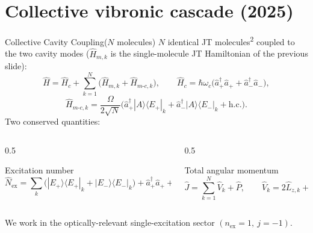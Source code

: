 \documentclass[aspectratio=169,11pt]{beamer}
\newcommand{\refmark}[1]{\textsuperscript{\color{srcgray}#1}}
\begin{document}
\section{Collective vibronic cascade (2025)}
\begin{frame}{Collective Cavity Coupling($N$ molecules)}
  \small
  $N$ identical JT molecules\refmark{2} coupled to the two cavity modes
  ($\hat H_{m,k}$ is the single-molecule JT Hamiltonian of the previous slide):
  \[
    \hat H=\hat H_c+\sum_{k=1}^{N}\big(\hat H_{m,k}+\hat H_{m\text{-}c,k}\big),\qquad
    \hat H_c=\hbar\omega_c\big(\hat a_+^\dagger\hat a_++\hat a_-^\dagger\hat a_-\big),
  \]
  \[
    \hat H_{m\text{-}c,k}=\frac{\Omega}{2\sqrt N}
      \big(\hat a_+^\dagger|A\rangle\langle E_+|_k+\hat a_-^\dagger|A\rangle\langle E_-|_k+\text{h.c.}\big).
  \]
   Two conserved quantities:
  \begin{columns}[T]
    \begin{column}{0.5\textwidth}
      \begin{block}{Excitation number}
      \vspace{-0.6em}
      \[\hat N_{\mathrm{ex}}=\sum_k\!\big(|E_+\rangle\langle E_+|_k+|E_-\rangle\langle E_-|_k\big)+\hat a_+^\dagger\hat a_++\hat a_-^\dagger\hat a_-\]
      \end{block}
    \end{column}
    \begin{column}{0.5\textwidth}
      \begin{block}{Total angular momentum}
      \vspace{-0.6em}
      \[\hat J=\sum_{k=1}^{N}\hat V_k+\hat P,\qquad \hat V_k=2\hat L_{z,k}+\hat S_{z,k}\]
      \end{block}
    \end{column}
  \end{columns}
  \vspace{0.4em}
  We work in the optically-relevant single-excitation sector
  $(n_{\mathrm{ex}}=1,\ j=-1)$.
\end{frame}
\end{document}
